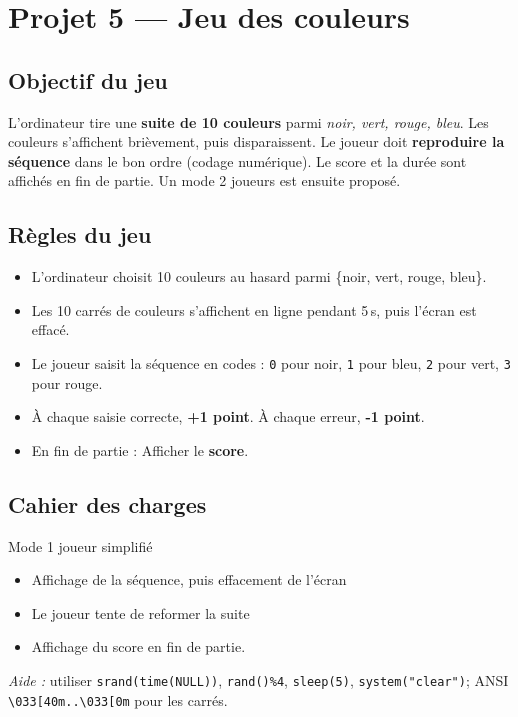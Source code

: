 \section{Projet 5 — Jeu des couleurs}

\subsection*{Objectif du jeu}
L’ordinateur tire une \textbf{suite de 10 couleurs} parmi \textit{noir, vert, rouge, bleu}. Les couleurs s’affichent brièvement, puis disparaissent. Le joueur doit \textbf{reproduire la séquence} dans le bon ordre (codage numérique). Le score et la durée sont affichés en fin de partie. Un mode 2 joueurs est ensuite proposé.

\subsection*{Règles du jeu}
\begin{itemize}
  \item L'ordinateur choisit 10 couleurs au hasard parmi \{noir, vert, rouge, bleu\}. 
  \item Les 10 carrés de couleurs s'affichent en ligne pendant 5\,s, puis l’écran est effacé.
  \item Le joueur saisit la séquence en codes : \texttt{0} pour noir, \texttt{1} pour bleu, \texttt{2} pour vert, \texttt{3} pour rouge.
  \item À chaque saisie correcte, \textbf{+1 point}. À chaque erreur, \textbf{-1 point}.
  \item En fin de partie : Afficher le \textbf{score}.
\end{itemize}

\subsection*{Cahier des charges}
\begin{UPSTICahierDesCharges}{Mode 1 joueur simplifié}
\begin{itemize}
  \item Affichage de la séquence, puis effacement de l'écran
  \item Le joueur tente de reformer la suite
  \item Affichage du score en fin de partie.
\end{itemize}
\textit{Aide :} utiliser \texttt{srand(time(NULL))}, \texttt{rand()\%4}, \texttt{sleep(5)}, \texttt{system("clear")}; ANSI \texttt{\textbackslash033[40m..\textbackslash033[0m} pour les carrés.
\end{UPSTICahierDesCharges}

